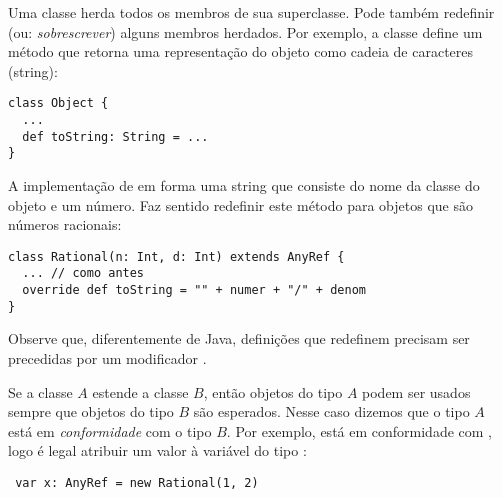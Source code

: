 Uma classe herda todos os membros de sua superclasse. Pode tamb\'{e}m redefinir
(ou: {\em sobrescrever}) alguns membros herdados. Por exemplo, a classe 
 define um m\'{e}todo  que retorna uma 
representa\c{c}\~{a}o do objeto como cadeia de caracteres (string): 
\begin{lstlisting}
class Object {
  ...
  def toString: String = ...
}
\end{lstlisting}

A implementa\c{c}\~{a}o de  em  forma uma string que 
consiste do nome da classe do objeto e um n\'{u}mero. Faz sentido redefinir este
m\'{e}todo para objetos que s\~{a}o n\'{u}meros racionais:  
\begin{lstlisting}
class Rational(n: Int, d: Int) extends AnyRef {
  ... // como antes
  override def toString = "" + numer + "/" + denom
}
\end{lstlisting}
Observe que, diferentemente de Java, defini\c{c}\~{o}es que redefinem precisam
ser precedidas por um modificador .  

Se a classe $A$ estende a classe $B$, ent\~{a}o objetos do tipo $A$ podem ser
usados sempre que objetos do tipo $B$ s\~{a}o esperados. Nesse caso dizemos que o 
tipo $A$ est\'{a} em {\em conformidade} com o tipo $B$. Por exemplo, 
est\'{a} em conformidade com , logo \'{e} legal atribuir um valor 
à vari\'{a}vel do tipo :
 
 \begin{lstlisting}
 var x: AnyRef = new Rational(1, 2)
 \end{lstlisting}

